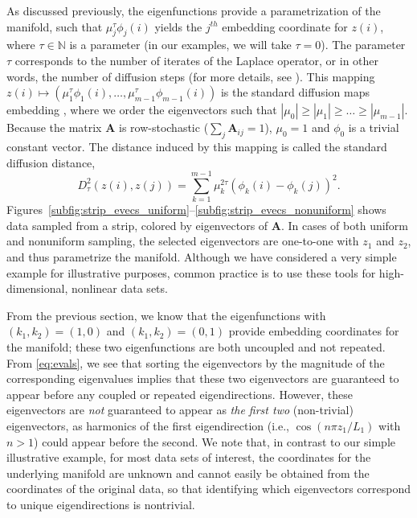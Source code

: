 \documentclass[3p]{elsarticle}
\begin{document}
As discussed previously, the eigenfunctions provide a parametrization of the manifold,
such that $\mu_j^\tau \phi_{j}(i)$ yields the $j^{th}$ embedding coordinate for $z(i)$, where $\tau \in \mathbb{N}$ is
a parameter (in our examples, we will take $\tau=0$).
%
The parameter $\tau$ corresponds to the number of iterates of the Laplace operator, or in other words, the number of diffusion steps (for more details, see \cite{coifman2006geometric}). 
%
% 
%
This mapping $z(i) \mapsto \left(\mu_1^\tau \phi_{1}(i), \dots, \mu_{m-1}^\tau \phi_{m-1}(i)\right)$ is the standard diffusion maps embedding \cite{coifman2005geometric, coifman2006geometric}, where
we order the eigenvectors such that $|\mu_0| \ge |\mu_1| \ge \dots \ge |\mu_{m-1}|$.
%
Because the matrix $\mathbf{A}$ is row-stochastic ($\sum_j \mathbf{A}_{ij} = 1$),  $\mu_0 = 1$ and $\phi_0$ is a trivial constant vector.
%
The distance induced by this mapping is called the standard diffusion distance,
%
\begin{equation}
D^2_\tau(z(i), z(j)) = \sum_{k=1}^{m-1} \mu_k^{2 \tau} \left( \phi_k(i) - \phi_k(j)  \right)^2.
\end{equation}
%
Figures~\ref{subfig:strip_evecs_uniform}--\ref{subfig:strip_evecs_nonuniform} shows
data sampled from a strip, colored by eigenvectors of $\mathbf{A}$.
%
In cases of both uniform and nonuniform sampling, the selected eigenvectors are one-to-one with $z_1$ and $z_2$,
and thus parametrize the manifold.
%
%
Although we have considered a very simple example for illustrative purposes, common practice is to use these tools for high-dimensional, nonlinear data sets.

From the previous section, we know that the eigenfunctions with $(k_1, k_2) =(1, 0)$ and $(k_1, k_2) =(0, 1)$
provide embedding coordinates for the manifold; these two eigenfunctions are both uncoupled and not repeated.
%
From \eqref{eq:evals}, we see that sorting the eigenvectors by the magnitude of
the corresponding eigenvalues implies that these two eigenvectors are guaranteed to
appear before any coupled or repeated eigendirections.
%
However, these eigenvectors are {\em not} guaranteed to appear as {\em the first two} (non-trivial) eigenvectors,
as harmonics of the first eigendirection (i.e., $\cos \left( n \pi z_1 / L_1 \right)$ with $n > 1$) could appear before the second.
%
We note that, in contrast to our simple illustrative example, for most data sets of interest, the coordinates for the underlying manifold are unknown and cannot easily be obtained from the coordinates of the original data, so that identifying which eigenvectors correspond to unique eigendirections is nontrivial.
\end{document}
